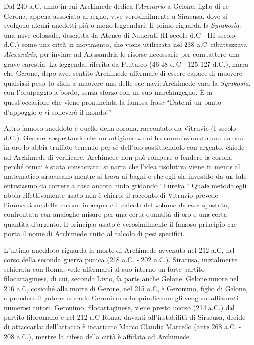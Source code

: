 \par Dal 240 a.C, anno in cui Archimede dedica l'\textit{Arenario} a Gelone, figlio di re Gerone, appena associato al regno, vive verosimilmente a Siracusa, dove si svolgono alcuni anedotti pi\`u o meno leggendari. Il primo riguarda la \textit{Syrakosia}: una nave colossale, descritta da Ateneo di Naucrati (II secolo d.C - III secolo d.C.) come una citt\`a in movimento, che viene utilizzata nel 238 a.C, ribattezzata \textit{Alexandris}, per inviare ad Alessandria le risorse necessarie per combattere una grave carestia. La leggenda, riferita da Plutarco (46-48 d.C - 125-127 d.C.), narra che Gerone, dopo aver sentito Archimede affermare di essere capace di muovere qualsiasi peso, lo sfida a muovere una delle sue navi: Archimede vara la \textit{Syrakosia}, con l'equipaggio a bordo, senza sforzo con un suo marchingegno. \`E in quest'occasione che viene pronunciata la famosa frase ``Datemi un punto d'appoggio e vi sollever\`o il mondo!''
\par Altro famoso aneddoto \`e quello della corona, raccontato da Vitruvio (I secolo d.C.): Gerone, sospettando che un artigiano a cui ha commissionato una corona in oro lo abbia truffato tenendo per s\'e dell'oro sostituendolo con argento, chiede ad Archimede di verificare. Archimede non pu\`o rompere o fondere la corona perch\'e ormai \`e stata consacrata: si narra che l'idea risolutiva viene in mente al matematico siracusano mentre si trova ai bagni e che egli sia investito da un tale entusiasmo da correre a casa ancora nudo gridando ``Eureka!'' Quale metodo egli abbia effettivamente usato non \`e chiaro: il racconto di Vitruvio prevede l'immersione della corona in acqua e il calcolo del volume da essa spostata, confrontata con analoghe misure per una certa quantit\`a di oro e una certa quantit\`a d'argento. Il principio usato \`e verosimilmente il famoso principio che porta il nome di Archimede unito al calcolo di pesi specifici.
\par L'ultimo aneddoto riguarda la morte di Archimede avvenuta nel 212 a.C, nel corso della seconda guerra punica (218 a.C. - 202 a.C.). Siracusa, inizialmente schierata con Roma, vede affermarsi al suo interno un forte partito filocartaginese, di cui, secondo Livio, fa parte anche Gelone. Gelone muore nel 216 a.C, cosicch\'e alla morte di Gerone, nel 215 a.C, \`e Geronimo, figlio di Gelone, a prendere il potere: essendo Geronimo solo quindicenne gli vengono affiancati numerosi tutori. Geronimo, filocartaginese, viene presto ucciso (214 a.C.) dal partito filoromano e nel 212 a.C Roma, davanti all'instabilit\`a di Siracusa, decide di attaccarla: dell'attacco \`e incaricato Marco Claudio Marcello (ante 268 a.C. - 208 a.C.), mentre la difesa della citt\`a \`e affidata ad Archimede.
